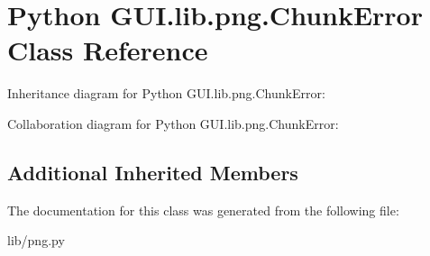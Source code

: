 \hypertarget{class_python_01_g_u_i_1_1lib_1_1png_1_1_chunk_error}{}\section{Python G\+U\+I.\+lib.\+png.\+Chunk\+Error Class Reference}
\label{class_python_01_g_u_i_1_1lib_1_1png_1_1_chunk_error}


Inheritance diagram for Python G\+U\+I.\+lib.\+png.\+Chunk\+Error\+:


Collaboration diagram for Python G\+U\+I.\+lib.\+png.\+Chunk\+Error\+:
\subsection*{Additional Inherited Members}


The documentation for this class was generated from the following file\+:\begin{DoxyCompactItemize}
\item 
lib/png.\+py\end{DoxyCompactItemize}
